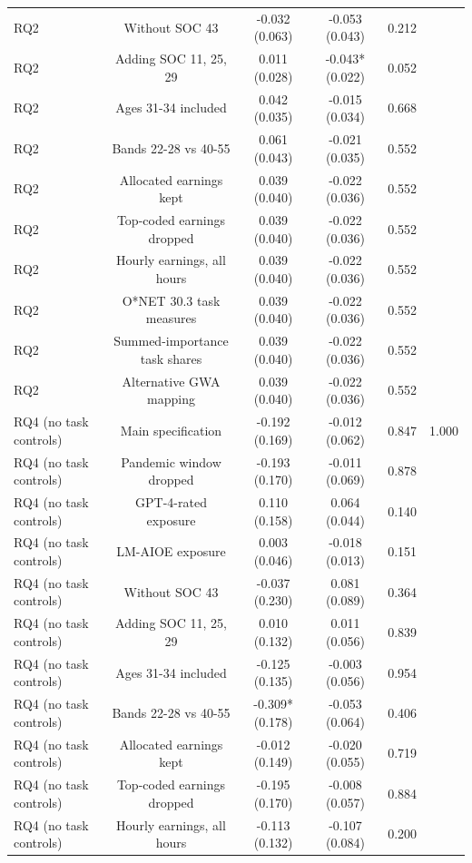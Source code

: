 \begin{table}[htbp]
\begin{tabular}{lccccc}
RQ2 & Without SOC 43 & -0.032 (0.063) & -0.053 (0.043) & 0.212 &  \\
RQ2 & Adding SOC 11, 25, 29 & 0.011 (0.028) & -0.043* (0.022) & 0.052 &  \\
RQ2 & Ages 31-34 included & 0.042 (0.035) & -0.015 (0.034) & 0.668 &  \\
RQ2 & Bands 22-28 vs 40-55 & 0.061 (0.043) & -0.021 (0.035) & 0.552 &  \\
RQ2 & Allocated earnings kept & 0.039 (0.040) & -0.022 (0.036) & 0.552 &  \\
RQ2 & Top-coded earnings dropped & 0.039 (0.040) & -0.022 (0.036) & 0.552 &  \\
RQ2 & Hourly earnings, all hours & 0.039 (0.040) & -0.022 (0.036) & 0.552 &  \\
RQ2 & O*NET 30.3 task measures & 0.039 (0.040) & -0.022 (0.036) & 0.552 &  \\
RQ2 & Summed-importance task shares & 0.039 (0.040) & -0.022 (0.036) & 0.552 &  \\
RQ2 & Alternative GWA mapping & 0.039 (0.040) & -0.022 (0.036) & 0.552 &  \\
RQ4 (no task controls) & Main specification & -0.192 (0.169) & -0.012 (0.062) & 0.847 & 1.000 \\
RQ4 (no task controls) & Pandemic window dropped & -0.193 (0.170) & -0.011 (0.069) & 0.878 &  \\
RQ4 (no task controls) & GPT-4-rated exposure & 0.110 (0.158) & 0.064 (0.044) & 0.140 &  \\
RQ4 (no task controls) & LM-AIOE exposure & 0.003 (0.046) & -0.018 (0.013) & 0.151 &  \\
RQ4 (no task controls) & Without SOC 43 & -0.037 (0.230) & 0.081 (0.089) & 0.364 &  \\
RQ4 (no task controls) & Adding SOC 11, 25, 29 & 0.010 (0.132) & 0.011 (0.056) & 0.839 &  \\
RQ4 (no task controls) & Ages 31-34 included & -0.125 (0.135) & -0.003 (0.056) & 0.954 &  \\
RQ4 (no task controls) & Bands 22-28 vs 40-55 & -0.309* (0.178) & -0.053 (0.064) & 0.406 &  \\
RQ4 (no task controls) & Allocated earnings kept & -0.012 (0.149) & -0.020 (0.055) & 0.719 &  \\
RQ4 (no task controls) & Top-coded earnings dropped & -0.195 (0.170) & -0.008 (0.057) & 0.884 &  \\
RQ4 (no task controls) & Hourly earnings, all hours & -0.113 (0.132) & -0.107 (0.084) & 0.200 &  \\

\end{tabular}
\end{table}
